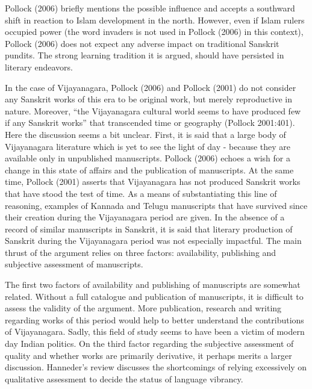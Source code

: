 Pollock (2006) briefly mentions the possible influence and accepts a southward shift in reaction to Islam development in the north. However, even if Islam rulers occupied power (the word invaders is not used in Pollock (2006) in this context), Pollock (2006) does not expect any adverse impact on traditional Sanskrit pundits. The strong learning tradition it is argued, should have persisted in literary endeavors. 
\vskip 1.5pt

In the case of Vijayanagara, Pollock (2006) and Pollock (2001) do not consider any Sanskrit works of this era to be original work, but merely reproductive in nature. Moreover, “the Vijayanagara cultural world seems to have produced few if any Sanskrit works” that transcended time or geography (Pollock 2001:401). Here the discussion seems a bit unclear. First, it is said that a large body of Vijayanagara literature which is yet to see the light of day - because they are available only in unpublished manuscripts. Pollock (2006) echoes a wish for a change in this state of affairs and the publication of manuscripts. At the same time, Pollock (2001) asserts that Vijayanagara has not produced Sanskrit works that have stood the test of time. As a means of substantiating this line of reasoning, examples of Kannada and Telugu manuscripts that have survived since their creation during the Vijayanagara period are given. In the absence of a record of similar manuscripts in Sanskrit, it is said that literary production of Sanskrit during the Vijayanagara period was not especially impactful. The main thrust of the argument relies on three factors: availability, publishing and subjective assessment of manuscripts.
\vskip 1.5pt

The first two factors of availability and publishing of manuscripts are somewhat related. Without a full catalogue and publication of manuscripts, it is difficult to assess the validity of the argument. More publication, research and writing regarding works of this period would help to better understand the contributions of Vijayanagara. Sadly, this field of study seems to have been a victim of modern day Indian politics. On the third factor regarding the subjective assessment of quality and whether works are primarily derivative, it perhaps merits a larger discussion. Hanneder’s review discusses the shortcomings of relying excessively on qualitative assessment to decide the status of language vibrancy. 
\vskip 1.5pt

